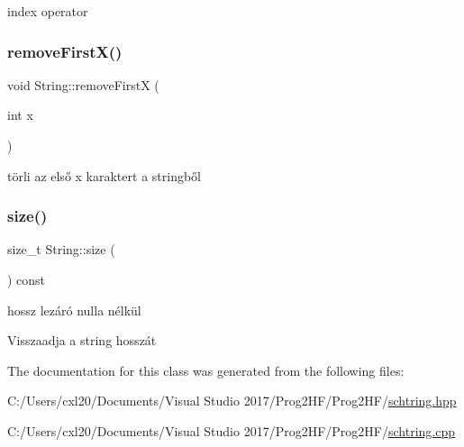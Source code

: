 index operator 

\mbox{\label{class_string_a15c07ede44c5bcfb0920e9bf63e75670}} 
\subsubsection{\texorpdfstring{removeFirstX()}{removeFirstX()}}
{\footnotesize\ttfamily void String\+::remove\+FirstX (\begin{DoxyParamCaption}\item[{int}]{x }\end{DoxyParamCaption})}



törli az első x karaktert a stringből 

\mbox{\label{class_string_a588c5cc9faededbb9d938662d354feed}} 
\subsubsection{\texorpdfstring{size()}{size()}}
{\footnotesize\ttfamily size\+\_\+t String\+::size (\begin{DoxyParamCaption}{ }\end{DoxyParamCaption}) const\hspace{0.3cm}{\ttfamily [inline]}}



hossz lezáró nulla nélkül 

Visszaadja a string hosszát 

The documentation for this class was generated from the following files\+:\begin{DoxyCompactItemize}
\item 
C\+:/\+Users/cxl20/\+Documents/\+Visual Studio 2017/\+Prog2\+H\+F/\+Prog2\+H\+F/\mbox{\hyperlink{schtring_8hpp}{schtring.\+hpp}}\item 
C\+:/\+Users/cxl20/\+Documents/\+Visual Studio 2017/\+Prog2\+H\+F/\+Prog2\+H\+F/\mbox{\hyperlink{schtring_8cpp}{schtring.\+cpp}}\end{DoxyCompactItemize}

